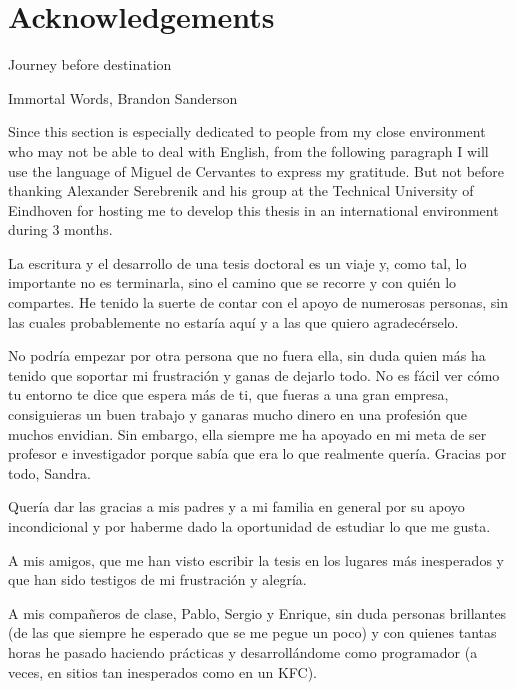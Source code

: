 \chapter{Acknowledgements}

\begin{FraseCelebre}
    \begin{Frase}
    Journey before destination
    \end{Frase}
    \begin{Fuente}
    Immortal Words, Brandon Sanderson
    \end{Fuente}
\end{FraseCelebre}

Since this section is especially dedicated to people from my close environment who may not be able to deal with English, from the following paragraph I will use the language of Miguel de Cervantes to express my gratitude. 
But not before thanking Alexander Serebrenik and his group at the Technical University of Eindhoven for hosting me to develop this thesis in an international environment during 3 months.

La escritura y el desarrollo de una tesis doctoral es un viaje y, como tal, lo importante no es terminarla, sino el camino que se recorre y con quién lo compartes. 
He tenido la suerte de contar con el apoyo de numerosas personas, sin las cuales probablemente no estaría aquí y a las que quiero agradecérselo.

No podría empezar por otra persona que no fuera ella, sin duda quien más ha tenido que soportar mi frustración y ganas de dejarlo todo. 
No es fácil ver cómo tu entorno te dice que espera más de ti, que fueras a una gran empresa, consiguieras un buen trabajo y ganaras mucho dinero en una profesión que muchos envidian. 
Sin embargo, ella siempre me ha apoyado en mi meta de ser profesor e investigador porque sabía que era lo que realmente quería. 
Gracias por todo, Sandra.

Quería dar las gracias a mis padres y a mi familia en general por su apoyo incondicional y por haberme dado la oportunidad de estudiar lo que me gusta.

A mis amigos, que me han visto escribir la tesis en los lugares más inesperados y que han sido testigos de mi frustración y alegría.

A mis compañeros de clase, Pablo, Sergio y Enrique, sin duda personas brillantes (de las que siempre he esperado que se me pegue un poco) y con quienes tantas horas he pasado haciendo prácticas y desarrollándome como programador (a veces, en sitios tan inesperados como en un KFC).

